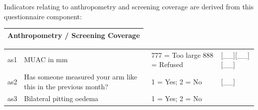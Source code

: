 \documentclass[12pt,a4paper]{book}
\theoremstyle{definition}
\theoremstyle{definition}
\theoremstyle{definition}
\theoremstyle{remark}
\begin{document}
Indicators relating to anthropometry and screening coverage are derived
from this questionnaire component:

\begin{longtable}[]{@{}c@{}}
\toprule
\begin{minipage}[t]{0.97\columnwidth}\centering
\textbf{Anthropometry / Screening Coverage}\strut
\end{minipage}\tabularnewline
\bottomrule
\end{longtable}

\begin{longtable}[]{@{}llll@{}}
\toprule
\begin{minipage}[t]{0.09\columnwidth}\raggedright
as1\strut
\end{minipage} & \begin{minipage}[t]{0.41\columnwidth}\raggedright
MUAC in mm\strut
\end{minipage} & \begin{minipage}[t]{0.25\columnwidth}\raggedright
777 = Too large 888 = Refused\strut
\end{minipage} & \begin{minipage}[t]{0.13\columnwidth}\raggedright
{[}\_\_{]}{[}\_\_{]}{[}\_\_{]}\strut
\end{minipage}\tabularnewline
\begin{minipage}[t]{0.09\columnwidth}\raggedright
as2\strut
\end{minipage} & \begin{minipage}[t]{0.41\columnwidth}\raggedright
Has someone measured your arm like this in the previous month?\strut
\end{minipage} & \begin{minipage}[t]{0.25\columnwidth}\raggedright
1 = Yes; 2 = No\strut
\end{minipage} & \begin{minipage}[t]{0.13\columnwidth}\raggedright
{[}\_\_{]}\strut
\end{minipage}\tabularnewline
\begin{minipage}[t]{0.09\columnwidth}\raggedright
as3\strut
\end{minipage} & \begin{minipage}[t]{0.41\columnwidth}\raggedright
Bilateral pitting oedema\strut
\end{minipage} & \begin{minipage}[t]{0.25\columnwidth}\raggedright
1 = Yes; 2 = No\strut
\end{minipage} & \begin{minipage}[t]{0.13\columnwidth}\raggedright

\end{minipage}
\end{longtable}
\end{document}
